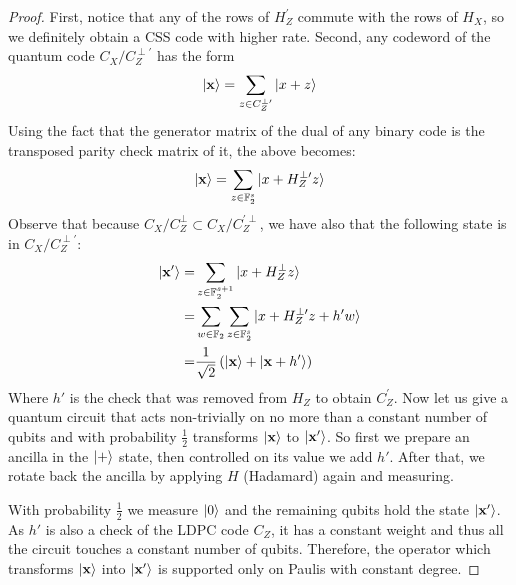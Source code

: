\documentclass[manuscript,screen,review]{acmart}
\begin{document}
\begin{proof}
First, notice that any of the rows of $H_Z^{\prime}$ commute with the rows of $H_X$, so we definitely obtain a CSS code with higher rate. Second, any codeword of the quantum code $C_X/C_Z^{\perp \prime}$ has the form  
\begin{equation*}
  \begin{split}
    \ket{\mathbf{x}} = \sum_{z \in C_Z^{\perp \prime}}{\ket{x + z}}
  \end{split}
\end{equation*}
Using the fact that the generator matrix of the dual of any binary code is the transposed parity check matrix of it, the above becomes:
\begin{equation*}
  \begin{split}
    \ket{\mathbf{x}} = \sum_{z \in \mathbb{F}_2^s}{\ket{x + H_Z^{\perp \prime}z}}
  \end{split}
\end{equation*}
Observe that because $C_X/C_Z^{\perp} \subset C_X/C_Z^{\prime \perp}$, we have also that the following state is in $C_X/C_Z^{\perp \prime}$:
\begin{equation*}
  \begin{split} 
    \ket{\mathbf{x'}} = & \sum_{z \in \mathbb{F}_2^{s+1}}{\ket{x + H_Z^{\perp}z}} \\
    =& \sum_{w \in \mathbb{F}_2}\sum_{z \in \mathbb{F}_2^s}{\ket{x + H_Z^{\perp \prime}z + h'w  }} \\ 
    =& \frac{1}{\sqrt{2}}\left( \ket{\mathbf{x}} + \ket{\mathbf{x} + h^{\prime}} \right)
  \end{split}
\end{equation*}
Where $h'$ is the check that was removed from $H_Z$ to obtain $C_Z^{\prime}$. Now let us give a quantum circuit that acts non-trivially on no more than a constant number of qubits and with probability $\frac{1}{2}$ transforms $\ket{\mathbf{x}}$ to $\ket{\mathbf{x'}}$. So first we prepare an ancilla in the $\ket{+}$ state, then controlled on its value we add $h'$. After that, we rotate back the ancilla by applying $H$ (Hadamard) again and measuring.

With probability $\frac{1}{2}$ we measure $\ket{0}$ and the remaining qubits hold the state $\ket{\mathbf{x'}}$. As $h'$ is also a check of the LDPC code $C_Z$, it has a constant weight and thus all the circuit touches a constant number of qubits. Therefore, the operator which transforms $\ket{\mathbf{x}}$ into $\ket{\mathbf{x'}}$ is supported only on Paulis with constant degree.     
\end{proof}  

% 

\printbibliography
\end{document}
